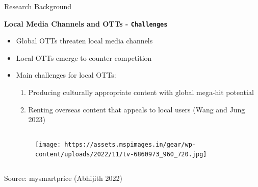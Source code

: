 \documentclass[
  ignorenonframetext,
]{beamer}
\begin{document}
\begin{frame}[fragile]{Research Background}
\protect\hypertarget{research-background-1}{}
\begin{block}{\textbf{Local Media Channels and OTTs -
\texttt{Challenges}}}
\protect\hypertarget{local-media-channels-and-otts---challenges}{}
\begin{itemize}
\item
  Global OTTs threaten local media channels
\item
  Local OTTs emerge to counter competition
\item
  Main challenges for local OTTs:

  \begin{enumerate}
  \item
    Producing culturally appropriate content with global mega-hit
    potential
  \item
    Renting overseas content that appeals to local users (Wang and Jung
    2023)
  \end{enumerate}
\end{itemize}

\begin{columns}[T]
\begin{column}{0.3\textwidth}
\end{column}

\begin{column}{0.5\textwidth}
\begin{figure}

\texttt{[image: https://assets.mspimages.in/gear/wp-content/uploads/2022/11/tv-6860973\_960\_720.jpg]} \hfill{}

\end{figure}
\end{column}
\end{columns}

Source: mysmartprice (Abhijith 2022)
\end{block}
\end{frame}
\end{document}
